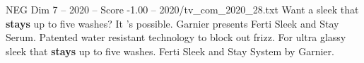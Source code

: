 \begin{textsample}{NEG Dim 7 – 2020 – Score -1.00 – 2020/tv\_com\_2020\_28.txt}  \label{ex:f7_neg_001}
Want a sleek that \textbf{stays} up to five washes?
It 's possible.
Garnier presents Ferti Sleek and Stay Serum.
Patented water resistant technology to block out frizz.
For ultra glassy sleek that \textbf{stays} up to five washes.
Ferti Sleek and Stay System by Garnier.

\end{textsample}
